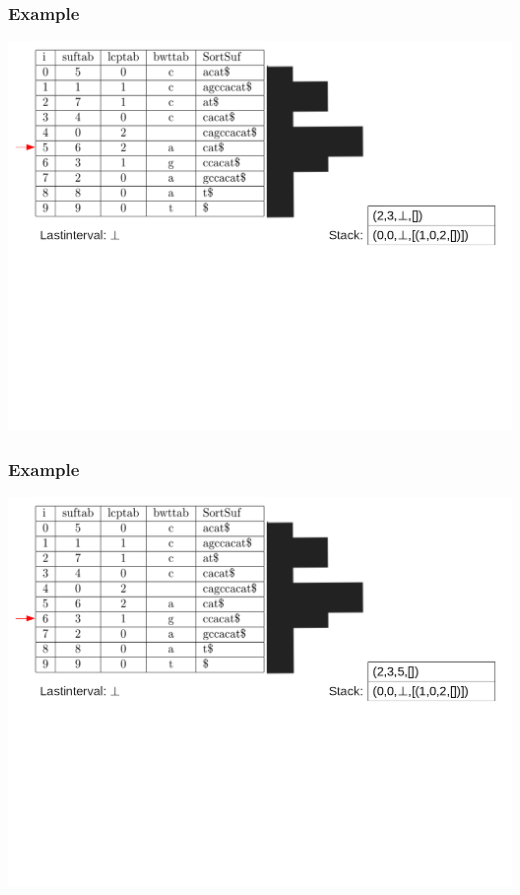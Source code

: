\documentclass[compress,handout]{beamer} %
\begin{document}
\begin{frame}
	\frametitle{Example}
	\includegraphics[width=\textwidth, height=\textheight, keepaspectratio=true]{traversal_8}
\end{frame}

\begin{frame}
	\frametitle{Example}
	\includegraphics[width=\textwidth, height=\textheight, keepaspectratio=true]{traversal_9}
\end{frame}
\end{document}
